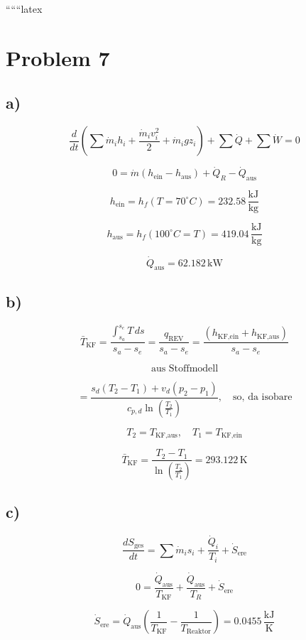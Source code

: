 
``````latex


\section*{Problem 7}

\subsection*{a)}

\[
\frac{d}{dt} \left( \sum \dot{m}_i h_i + \frac{\dot{m}_i v_i^2}{2} + \dot{m}_i g z_i \right) + \sum \dot{Q} + \sum \dot{W} = 0
\]

\[
0 = \dot{m} (h_{\text{ein}} - h_{\text{aus}}) + \dot{Q}_R - \dot{Q}_{\text{aus}}
\]

\[
h_{\text{ein}} = h_f (T = 70^\circ C) = 232.58 \, \frac{\text{kJ}}{\text{kg}}
\]

\[
h_{\text{aus}} = h_f (100^\circ C = T) = 419.04 \, \frac{\text{kJ}}{\text{kg}}
\]

\[
\dot{Q}_{\text{aus}} = 62.182 \, \text{kW}
\]

\subsection*{b)}

\[
\bar{T}_{\text{KF}} = \frac{\int_{s_a}^{s_e} T \, ds}{s_a - s_e} = \frac{q_{\text{REV}}}{s_a - s_e} = \frac{(h_{\text{KF,ein}} + h_{\text{KF,aus}})}{s_a - s_e}
\]

\[
\text{aus Stoffmodell}
\]

\[
= \frac{s_{d} (T_2 - T_1) + v_d (p_2 - p_1)}{c_{p,d} \ln \left( \frac{T_2}{T_1} \right)}, \quad \text{so, da isobare}
\]

\[
T_2 = T_{\text{KF,aus}}, \quad T_1 = T_{\text{KF,ein}}
\]

\[
\bar{T}_{\text{KF}} = \frac{T_2 - T_1}{\ln \left( \frac{T_2}{T_1} \right)} = 293.122 \, \text{K}
\]

\subsection*{c)}

\[
\frac{dS_{\text{ges}}}{dt} = \sum \dot{m}_i s_i + \frac{\dot{Q}_i}{T_i} + \dot{S}_{\text{ere}}
\]

\[
0 = \frac{\dot{Q}_{\text{aus}}}{T_{\text{KF}}} + \frac{\dot{Q}_{\text{aus}}}{T_R} + \dot{S}_{\text{ere}}
\]

\[
\dot{S}_{\text{ere}} = \dot{Q}_{\text{aus}} \left( \frac{1}{T_{\text{KF}}} - \frac{1}{T_{\text{Reaktor}}} \right) = 0.0455 \, \frac{\text{kJ}}{\text{K}}
\]

